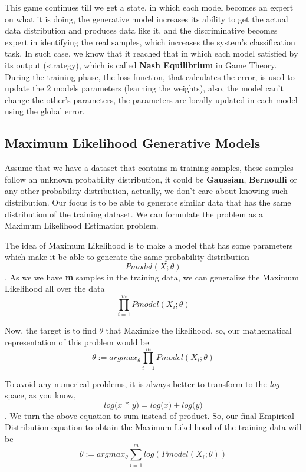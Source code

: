 \documentclass{winnower}
\begin{document}
This game continues till we get a state, in which each model becomes an expert on what it is doing, the generative model increases its ability to get the actual data distribution and produces data like it, and the discriminative becomes expert in identifying the real samples, which increases the system’s classification task. In such case, we know that it reached that in which each model satisfied by its output (strategy), which is called \textbf{Nash Equilibrium} in Game Theory. During the training phase, the loss function, that calculates the error, is used to update the 2 models parameters (learning the weights), also, the model can’t change the other’s parameters, the parameters are locally updated in each model using the global error.

\subsection{Maximum Likelihood Generative Models}

Assume that we have a dataset that contains m training samples, these samples follow an unknown probability distribution, it could be \textbf{Gaussian}, \textbf{Bernoulli} or any other probability distribution, actually, we don’t care about knowing such distribution. Our focus is to be able to generate similar data that has the same distribution of the training dataset. We can formulate the problem as a Maximum Likelihood Estimation problem.\newline

The idea of Maximum Likelihood is to make a model that has some parameters which make it be able to generate the same probability distribution \[Pmodel(X;\theta)\]. As we we have \textbf{m} samples in the training data, we can generalize the Maximum Likelihood all over the data \[\prod_{i = 1}^m Pmodel(X_i;\theta)\]

Now, the target is to find \(\theta\) that Maximize the likelihood, so, our mathematical representation of this problem would be \[\theta:=argmax_\theta \prod_{i = 1}^m Pmodel(X_i;\theta)\]

To avoid any numerical problems, it is always better to transform to the \textit{log} space, as you know, \[\textit{log(x * y)} = \textit{log(x)} + \textit{log(y)}\]. 
We turn the above equation to sum instead of product. So, our final Empirical Distribution equation to obtain the Maximum Likelihood of the training data will be \[\theta:=argmax_\theta \sum_{i = 1}^m log(Pmodel(X_i;\theta))\]
\end{document}
